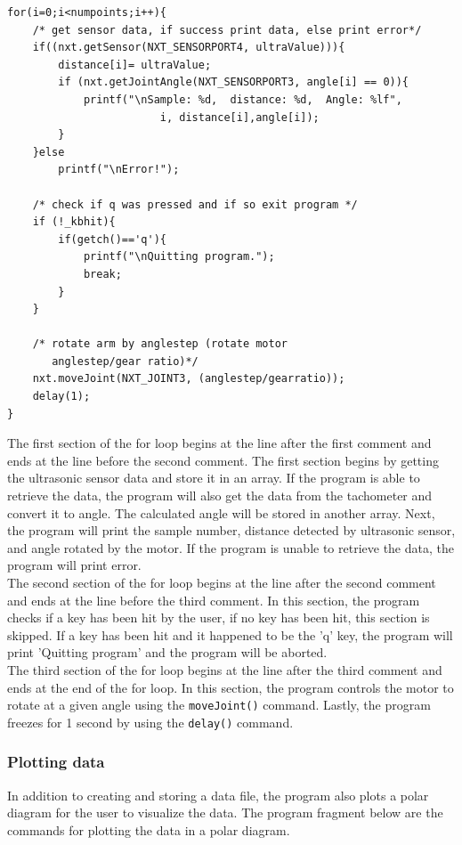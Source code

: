 \documentclass[11pt]{article}
\begin{document}
\begin{verbatim}
for(i=0;i<numpoints;i++){
    /* get sensor data, if success print data, else print error*/
    if((nxt.getSensor(NXT_SENSORPORT4, ultraValue))){
        distance[i]= ultraValue;
        if (nxt.getJointAngle(NXT_SENSORPORT3, angle[i] == 0)){
            printf("\nSample: %d,  distance: %d,  Angle: %lf",
                        i, distance[i],angle[i]);
        }
    }else	
        printf("\nError!");

    /* check if q was pressed and if so exit program */
    if (!_kbhit){
        if(getch()=='q'){
            printf("\nQuitting program.");
            break;
        }
    }		

    /* rotate arm by anglestep (rotate motor 
       anglestep/gear ratio)*/
    nxt.moveJoint(NXT_JOINT3, (anglestep/gearratio));
    delay(1);
}
\end{verbatim}

The first section of the for loop begins at the line after the first comment and ends at the line
before the second comment. The first section begins by getting the ultrasonic sensor data and store 
it in an array. If the program is able to retrieve the data, the program will also get the data from 
the tachometer and convert it to angle. The calculated angle will be stored in another array.
Next, the program will print the sample number, distance detected by ultrasonic sensor, and angle
rotated by the motor. If the program is unable to retrieve the data, the program will print error.\\ 
\newline
The second section of the for loop begins at the line after the second comment and ends at the line
before the third comment. In this section, the program checks if a key has been hit by the user, if 
no key has been hit, this section is skipped. If a key has been hit and it happened to be the 'q' 
key, the program will print 'Quitting program' and the program will be aborted.\\
\newline
The third section of the for loop begins at the line after the third comment and ends at the end of
the for loop. In this section, the program controls the motor to rotate at a given angle using the 
\verb+moveJoint()+ command. Lastly, the program freezes for 1 second by using the \verb+delay()+ command.

\subsubsection*{Plotting data}
In addition to creating and storing a data file, the program also plots a polar diagram for
the user to visualize the data. The program fragment below are the commands for plotting the 
data in a polar diagram.
\end{document}
